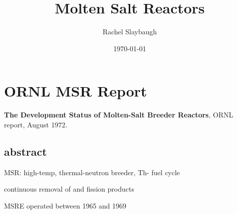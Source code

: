 \documentclass[12pt,twoside]{article}
\date{\today}
\title{Molten Salt Reactors}
\author{Rachel Slaybaugh}
\begin{document}
\maketitle

\section*{ORNL MSR Report}
\textbf{The Development Status of Molten-Salt Breeder Reactors}, ORNL report,
August 1972.

\subsection*{abstract}
\begin{compactitem}
\item MSR: high-temp, thermal-neutron breeder, Th- fuel cycle
\item continuous removal of  and fission products
\item MSRE operated between 1965 and 1969
\end{compactitem}
\end{document}

